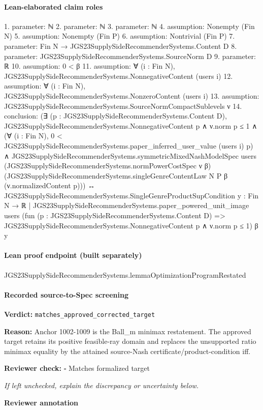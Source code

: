 \documentclass[10pt]{article}
\newcommand{\reviewerbox}{%
  \par\noindent\fbox{\parbox{0.96\linewidth}{\rule{0pt}{0.38in}}}\par
}
\newcommand{\reviewmatch}[1]{%
  \par\noindent\textbf{Reviewer check:} $\square$\; #1\par
  \noindent\emph{If left unchecked, explain the discrepancy or uncertainty below.}\par
}
\begin{document}
\paragraph{Lean-elaborated claim roles}\begin{ReviewVerbatim}
1. parameter: ℕ
2. parameter: ℕ
3. parameter: ℕ
4. assumption: Nonempty (Fin N)
5. assumption: Nonempty (Fin P)
6. assumption: Nontrivial (Fin P)
7. parameter: Fin N → JGS23SupplySideRecommenderSystems.Content D
8. parameter: JGS23SupplySideRecommenderSystems.SourceNorm D
9. parameter: ℝ
10. assumption: 0 < β
11. assumption: ∀ (i : Fin N), JGS23SupplySideRecommenderSystems.NonnegativeContent (users i)
12. assumption: ∀ (i : Fin N), JGS23SupplySideRecommenderSystems.NonzeroContent (users i)
13. assumption: JGS23SupplySideRecommenderSystems.SourceNormCompactSublevels ν
14. conclusion: (∃ (p : JGS23SupplySideRecommenderSystems.Content D),
    JGS23SupplySideRecommenderSystems.NonnegativeContent p ∧
      ν.norm p ≤ 1 ∧
        (∀ (i : Fin N), 0 < JGS23SupplySideRecommenderSystems.paper_inferred_user_value (users i) p) ∧
          JGS23SupplySideRecommenderSystems.symmetricMixedNashModelSpec users
            (JGS23SupplySideRecommenderSystems.normPowerCostSpec ν β)
            (JGS23SupplySideRecommenderSystems.singleGenreContentLaw N P β (ν.normalizedContent p))) ↔
  JGS23SupplySideRecommenderSystems.SingleGenreProductSupCondition
    {y : Fin N → ℝ |
      JGS23SupplySideRecommenderSystems.paper_powered_unit_image users
        (fun (p : JGS23SupplySideRecommenderSystems.Content D) =>
          JGS23SupplySideRecommenderSystems.NonnegativeContent p ∧ ν.norm p ≤ 1)
        β y}
\end{ReviewVerbatim}

\paragraph{Lean proof endpoint (built separately)}\begin{ReviewVerbatim}
JGS23SupplySideRecommenderSystems.lemmaOptimizationProgramRestated
\end{ReviewVerbatim}

\paragraph{Recorded source-to-Spec screening}
\textbf{Verdict:} \texttt{matches\_approved\_corrected\_target}
\\
{\raggedright
\textbf{Reason:} Anchor 1002-\allowbreak{}1009 is the Ball\_\allowbreak{}m minimax restatement.\allowbreak{}  The approved target retains its positive feasible-\allowbreak{}ray domain and replaces the unsupported ratio minimax equality by the attained source-\allowbreak{}Nash certificate/\allowbreak{}product-\allowbreak{}condition iff.\allowbreak{}
\par}
\reviewmatch{Matches formalized target}
\noindent\textbf{Reviewer annotation}\par
\reviewerbox
\clearpage
\hypertarget{source-claim-39baad948341889c}{}
\end{document}
